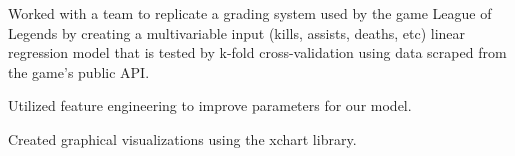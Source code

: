 \documentclass[]{deedy-resume-openfont}
\begin{document}
\begin{minipage}[t]{0.66\textwidth}
\begin{tightemize}
\item Worked with a team to replicate a grading system used by the game League of Legends by creating a multivariable input (kills, assists, deaths, etc) linear regression model that is tested by k-fold cross-validation using data scraped from the game's public API.
\item Utilized feature engineering to improve parameters for our model.
\item Created graphical visualizations using the xchart library.
\end{tightemize}
\sectionsep




\end{minipage} 
\end{document}
